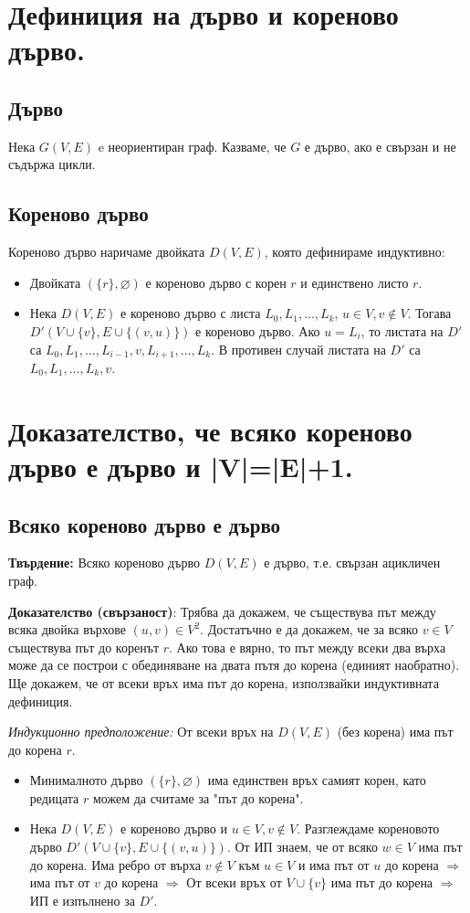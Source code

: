 \documentclass[fleqn,12pt]{article}
\begin{document}
\section{Дефиниция на дърво и кореново дърво.}

\subsection{Дърво}
Нека $G(V, E)$ e неориентиран граф. Казваме, че $G$ е дърво, ако е свързан и не съдържа цикли.

\subsection{Кореново дърво}
Кореново дърво наричаме двойката $D(V, E)$, която дефинираме индуктивно:
\begin{itemize}
	\item Двойката $(\{r\}, \varnothing)$ е кореново дърво с корен $r$ и единствено листо $r$.
	\item Нека $D(V,E)$ е кореново дърво с листа $L_0, L_1, \dots, L_k$, $u \in V, v \notin V$. Тогава $D'(V \cup \{v\}, E \cup \{ (v, u)\})$ е кореново дърво.
	Ако $u = L_i$, то листата на $D'$ са $L_0, L_1, \dots, L_{i-1}, v, L_{i+1}, \dots, L_k$. В противен случай листата на $D'$ са 
	$L_0, L_1, \dots, L_k, v$.
\end{itemize}

\section{Доказателство, че всяко кореново дърво е дърво и |V|=|E|+1.}
\subsection{Всяко кореново дърво е дърво}
\textbf{Твърдение:} Всяко кореново дърво $D(V,E)$ е дърво, т.е. свързан ацикличен граф.

\textbf{Доказателство (свързаност)}: Трябва да докажем, че съществува път между всяка двойка върхове $(u, v) \in V^2$. Достатъчно е да докажем, че 
за всяко $v \in V$ съществува път до коренът $r$. Ако това е вярно, то път между всеки два върха може да се построи с обединяване на двата пътя до корена 
(единият наобратно). Ще докажем, че от всеки връх има път до корена, използвайки индуктивната дефиниция.

\textit{Индукционно предположение:} От всеки връх на $D(V,E)$ (без корена) има път до корена $r$. 
\begin{itemize}
	\item Минималното дърво $(\{r\}, \varnothing)$ има единствен връх самият корен, като редицата $r$ можем да считаме за "път до корена".
	\item Нека $D(V,E)$ е кореново дърво и $u \in V, v \notin V$. Разглеждаме кореновото дърво $D'(V \cup \{v\}, E \cup \{ (v, u)\})$.
	От ИП знаем, че от всяко $w \in V$ има път до корена. Има ребро от върха $v \notin V$ към $u \in V$ и има път от $u$ до корена $\Rightarrow$
	има път от $v$ до корена $\Rightarrow$ От всеки връх от $V \cup \{v\}$ има път до корена $\Rightarrow$ ИП е изпълнено за $D'$.
\end{itemize}
\end{document}
